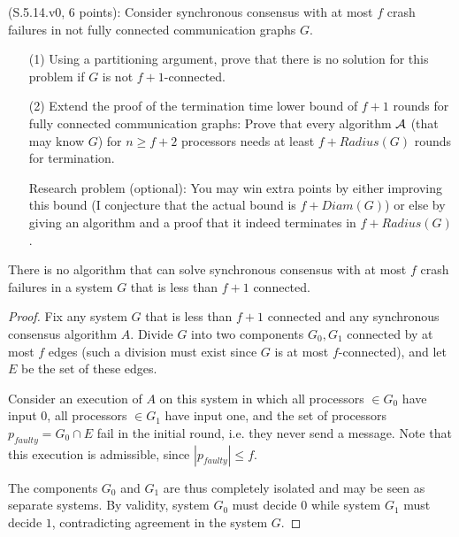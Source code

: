 
\begin{Exc}{(S.5.14.v0, 6 points):}
Consider synchronous consensus with at most $f$ crash failures in not
fully connected communication graphs $G$.
\begin{enumerate}
\item[(1)] Using a partitioning argument, prove that there is no solution for this problem if $G$
is not $f+1$-connected.
\item[(2)] Extend the proof of the termination time lower bound of $f+1$ rounds
for fully connected communication graphs: Prove that every algorithm ${\cal A}$
(that may know $G$) for $n\geq f+2$ processors needs at least $f+Radius(G)$ rounds
for termination.

Research problem (optional): You may win extra points by either improving this
bound (I conjecture that the actual bound is $f+Diam(G)$) or else
by giving an algorithm and a proof that it indeed terminates in
$f+Radius(G)$.
\end{enumerate}
\end{Exc}

\begin{theorem}
There is no algorithm that can solve synchronous consensus with at most $f$
crash failures in a system $G$ that is less than $f+1$ connected.
\end{theorem}

\begin{proof}
Fix any system $G$ that is less than $f+1$ connected and any synchronous consensus
algorithm $A$. Divide $G$ into two components $G_0, G_1$ connected by at most $f$
edges (such a division must exist since $G$ is at most $f$-connected), and let
$E$ be the set of these edges.

Consider an execution of $A$ on this system in which all processors $\in G_0$
have input $0$, all processors $\in G_1$ have input one, and the set of processors
$p_{faulty} = G_0 \cap E$ fail in the initial round, i.e. they never send
a message. Note that this execution is admissible, since $|p_{faulty}| \leq f$.

The components $G_0$ and $G_1$ are thus completely isolated and may be seen as
separate systems. By validity, system $G_0$ must decide $0$ while system $G_1$
must decide $1$, contradicting agreement in the system $G$.
\end{proof}
